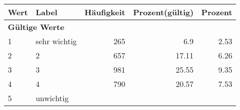      \begin{longtable}{lXrrr}
     \toprule
     \textbf{Wert} & \textbf{Label} & \textbf{Häufigkeit} & \textbf{Prozent(gültig)} & \textbf{Prozent} \\
     \endhead
     \midrule
     \multicolumn{5}{l}{\textbf{Gültige Werte}}\\

     1 &
     \multicolumn{1}{X}{ sehr wichtig   } &


       \num{265} &
       \num[round-mode=places,round-precision=2]{6.9} &
         \num[round-mode=places,round-precision=2]{2.53} \\

     2 &
     \multicolumn{1}{X}{ 2   } &


       \num{657} &
       \num[round-mode=places,round-precision=2]{17.11} &
         \num[round-mode=places,round-precision=2]{6.26} \\

     3 &
     \multicolumn{1}{X}{ 3   } &


       \num{981} &
       \num[round-mode=places,round-precision=2]{25.55} &
         \num[round-mode=places,round-precision=2]{9.35} \\

     4 &
     \multicolumn{1}{X}{ 4   } &


       \num{790} &
       \num[round-mode=places,round-precision=2]{20.57} &
         \num[round-mode=places,round-precision=2]{7.53} \\

     5 &
     \multicolumn{1}{X}{ unwichtig   } &



\end{longtable}
